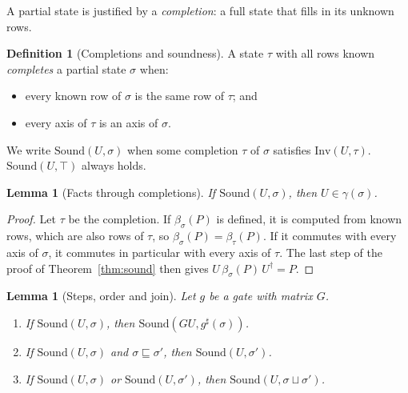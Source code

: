 \documentclass[11pt]{article}
\newtheorem{lemma}[theorem]{Lemma}
\theoremstyle{definition}
\newtheorem{definition}[theorem]{Definition}
\theoremstyle{remark}
\newcommand{\adj}{^{\dagger}}
\newcommand{\gam}{\gamma}
\newcommand{\back}{\beta}
\begin{document}
A partial state is justified by a \emph{completion}: a full state that fills in its unknown
rows.

\begin{definition}[Completions and soundness]
A state $\tau$ with all rows known \emph{completes} a partial state $\sigma$ when:
\begin{itemize}[nosep]
  \item every known row of $\sigma$ is the same row of $\tau$; and
  \item every axis of $\tau$ is an axis of $\sigma$.
\end{itemize}
We write $\mathrm{Sound}(U, \sigma)$ when some completion $\tau$ of $\sigma$ satisfies
$\mathrm{Inv}(U, \tau)$. $\mathrm{Sound}(U, \top)$ always holds.
\end{definition}

\begin{lemma}[Facts through completions]\label{lem:sound-gamma}
If $\mathrm{Sound}(U, \sigma)$, then $U \in \gam(\sigma)$.
\end{lemma}

\begin{proof}
Let $\tau$ be the completion. If $\back_\sigma(P)$ is defined, it is computed from known
rows, which are also rows of $\tau$, so $\back_\sigma(P) = \back_\tau(P)$. If it commutes
with every axis of $\sigma$, it commutes in particular with every axis of $\tau$. The last
step of the proof of Theorem~\ref{thm:sound} then gives $U\,\back_\sigma(P)\,U\adj = P$.
\end{proof}

\begin{lemma}[Steps, order and join]\label{lem:partial}
Let $g$ be a gate with matrix $G$.
\begin{enumerate}[label=(\alph*), nosep]
  \item If $\mathrm{Sound}(U, \sigma)$, then $\mathrm{Sound}(GU, g^\sharp(\sigma))$.
  \item If $\mathrm{Sound}(U, \sigma)$ and $\sigma \sqsubseteq \sigma'$, then
  $\mathrm{Sound}(U, \sigma')$.
  \item If $\mathrm{Sound}(U, \sigma)$ or $\mathrm{Sound}(U, \sigma')$, then
  $\mathrm{Sound}(U, \sigma \sqcup \sigma')$.
\end{enumerate}
\end{lemma}
\end{document}
